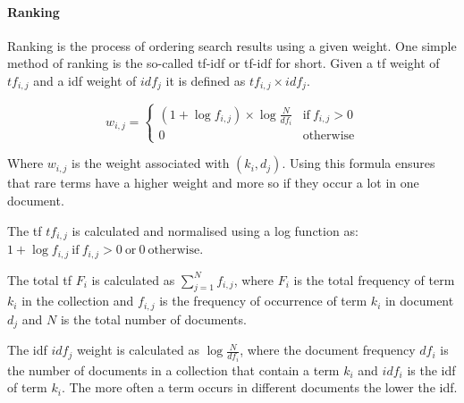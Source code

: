 \paragraph{Ranking}

Ranking is the process of ordering search results using a given weight. One simple method of ranking is the so-called \acrlong{tf}-\acrlong{idf} or \acrshort{tf}-\acrshort{idf} for short. Given a \gls{tf} weight of $tf_{i,j}$ and a \gls{idf} weight of $idf_j$ it is defined as $tf_{i,j}\times idf_j$.

\begin{equation}
  w_{i,j} =
  \begin{cases}
  (1+\log f_{i,j})\times \log\frac{N}{df_i} & \text{if} \ f_{i,j} > 0 \\
  0 & \text{otherwise}
  \end{cases}
  \label{eq:wij}
\end{equation}

Where $w_{i,j}$ is the weight associated with $(k_i,d_j)$. Using this formula ensures that rare terms have a higher weight and more so if they occur a lot in one document.

The \gls{tf} $tf_{i,j}$ is calculated and normalised using a log function as:
$1+\log f_{i,j} \ \text{if} \ f_{i,j} > 0 \ \text{or} \ 0 \ \text{otherwise}$.

The total \gls{tf} $F_i$ is calculated as $\sum_{j=1}^{N}f_{i,j}$, where $F_i$ is the total frequency of term $k_i$ in the collection and $f_{i,j}$ is the frequency of occurrence of term $k_i$ in document $d_j$ and $N$ is the total number of documents.

The \gls{idf} $idf_j$ weight is calculated as $\log \frac{N}{df_i}$, where the document frequency $df_i$ is the number of documents in a collection that contain a term $k_i$ and $idf_i$ is the \gls{idf} of term $k_i$. The more often a term occurs in different documents the lower the \gls{idf}.



